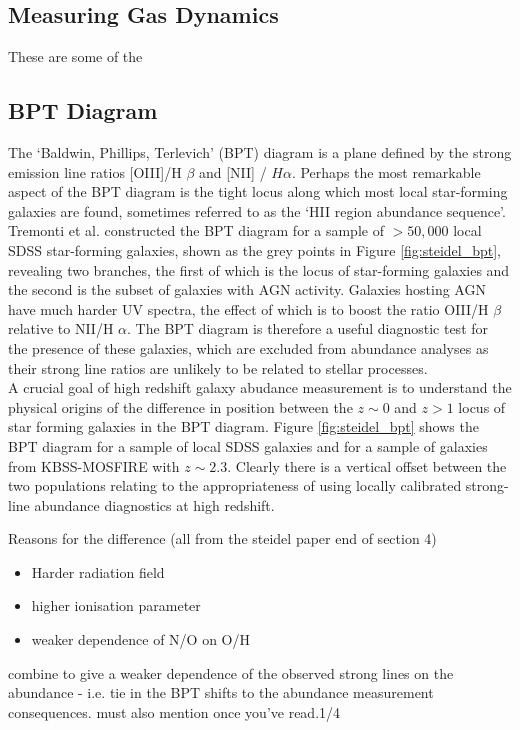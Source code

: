 \documentclass{literature}
\begin{document}
\subsection{Measuring Gas Dynamics}\label{subsec:Gas-Dynamics}

These are some of the 

\subsection{BPT Diagram}\label{subsec:BPT-diagram}
The `Baldwin, Phillips, Terlevich' (BPT) diagram is a plane defined by the strong emission line ratios [OIII]/H $\beta$ and [NII] / $H\alpha$. Perhaps the most remarkable aspect of the BPT diagram is the tight locus along which most local star-forming galaxies are found, sometimes referred to as the `HII region abundance sequence'. Tremonti et al. constructed the BPT diagram for a sample of $> 50,000$ local SDSS star-forming galaxies, shown as the grey points in Figure \ref{fig:steidel_bpt}, revealing two branches, the first of which is the locus of star-forming galaxies and the second is the subset of galaxies with AGN activity. Galaxies hosting AGN have much harder UV spectra, the effect of which is to boost the ratio OIII/H $\beta$ relative to NII/H $\alpha$. The BPT diagram is therefore a useful diagnostic test for the presence of these galaxies, which are excluded from abundance analyses as their strong line ratios are unlikely to be related to stellar processes. \\ 


A crucial goal of high redshift galaxy abudance measurement is to understand the physical origins of the difference in position between the $z \sim 0$ and $z > 1$ locus of star forming galaxies in the BPT diagram. Figure \ref{fig:steidel_bpt} shows the BPT diagram for a sample of local SDSS galaxies \citep{Tremonti2004} and for a sample of galaxies from KBSS-MOSFIRE with $z \sim 2.3$. Clearly there is a vertical offset between the two populations  
relating to the appropriateness of using locally calibrated strong-line abundance diagnostics at high redshift. 

Reasons for the difference (all from the steidel paper end of section 4)
\begin{itemize}
	\item Harder radiation field 
	\item higher ionisation parameter 
	\item weaker dependence of N/O on O/H
\end{itemize}
combine to give a weaker dependence of the observed strong lines on the abundance - i.e. tie in the BPT shifts to the abundance measurement consequences. 
must also mention \citep{Kewley2013} once you've read.1/4
\end{document}

